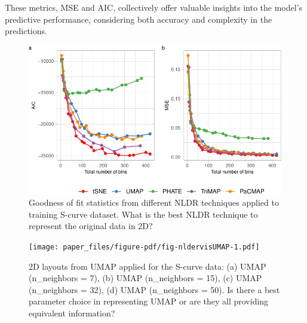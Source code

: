 \documentclass[
  12pt]{article}
\begin{document}
These metrics, MSE and AIC, collectively offer valuable insights into
the model's predictive performance, considering both accuracy and
complexity in the predictions.

\begin{figure}

{\centering \includegraphics[width=1\textwidth,height=\textheight]{paper_files/figure-pdf/fig-diagnosticpltScurve-1.pdf}

}

\caption{\label{fig-diagnosticpltScurve}Goodness of fit statistics from
different NLDR techniques applied to training S-curve dataset. What is
the best NLDR technique to represent the original data in 2D?}

\end{figure}

\begin{figure}

{\centering \texttt{[image: paper\_files/figure-pdf/fig-nldervisUMAP-1.pdf]}

}

\caption{\label{fig-nldervisUMAP}2D layouts from UMAP applied for the
S-curve data: (a) UMAP (n\_neighbors = 7), (b) UMAP (n\_neighbors = 15),
(c) UMAP (n\_neighbors = 32), (d) UMAP (n\_neighbors = 50). Is there a
best parameter choice in representing UMAP or are they all providing
equivalent information?}

\end{figure}
\end{document}

